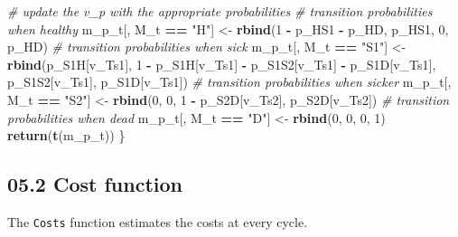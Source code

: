 \documentclass[
]{article}
\newenvironment{Shaded}{\begin{snugshade}}{\end{snugshade}}
\newcommand{\CommentTok}[1]{\textcolor[rgb]{0.56,0.35,0.01}{\textit{#1}}}
\newcommand{\DecValTok}[1]{\textcolor[rgb]{0.00,0.00,0.81}{#1}}
\newcommand{\KeywordTok}[1]{\textcolor[rgb]{0.13,0.29,0.53}{\textbf{#1}}}
\newcommand{\NormalTok}[1]{#1}
\newcommand{\OperatorTok}[1]{\textcolor[rgb]{0.81,0.36,0.00}{\textbf{#1}}}
\newcommand{\StringTok}[1]{\textcolor[rgb]{0.31,0.60,0.02}{#1}}
\begin{document}
\begin{Shaded}
\begin{Highlighting}[]
  \CommentTok{# update the v_p with the appropriate probabilities   }
  \CommentTok{# transition probabilities when healthy}
\NormalTok{  m_p_t[, M_t }\OperatorTok{==}\StringTok{ "H"}\NormalTok{]  <-}\StringTok{ }\KeywordTok{rbind}\NormalTok{(}\DecValTok{1} \OperatorTok{-}\StringTok{ }\NormalTok{p_HS1 }\OperatorTok{-}\StringTok{ }\NormalTok{p_HD, p_HS1, }\DecValTok{0}\NormalTok{, p_HD)   }
  \CommentTok{# transition probabilities when sick}
\NormalTok{  m_p_t[, M_t }\OperatorTok{==}\StringTok{ "S1"}\NormalTok{] <-}\StringTok{ }\KeywordTok{rbind}\NormalTok{(p_S1H[v_Ts1], }\DecValTok{1} \OperatorTok{-}\StringTok{ }\NormalTok{p_S1H[v_Ts1] }\OperatorTok{-}\StringTok{ }\NormalTok{p_S1S2[v_Ts1] }\OperatorTok{-}\StringTok{ }
\StringTok{                                }\NormalTok{p_S1D[v_Ts1], p_S1S2[v_Ts1], p_S1D[v_Ts1])  }
  \CommentTok{# transition probabilities when sicker}
\NormalTok{  m_p_t[, M_t }\OperatorTok{==}\StringTok{ "S2"}\NormalTok{] <-}\StringTok{ }\KeywordTok{rbind}\NormalTok{(}\DecValTok{0}\NormalTok{, }\DecValTok{0}\NormalTok{, }\DecValTok{1} \OperatorTok{-}\StringTok{ }\NormalTok{p_S2D[v_Ts2], p_S2D[v_Ts2])                   }
  \CommentTok{# transition probabilities when dead  }
\NormalTok{  m_p_t[, M_t }\OperatorTok{==}\StringTok{ "D"}\NormalTok{]  <-}\StringTok{ }\KeywordTok{rbind}\NormalTok{(}\DecValTok{0}\NormalTok{, }\DecValTok{0}\NormalTok{, }\DecValTok{0}\NormalTok{, }\DecValTok{1}\NormalTok{)                                                         }
  \KeywordTok{return}\NormalTok{(}\KeywordTok{t}\NormalTok{(m_p_t))}
\NormalTok{\}       }
\end{Highlighting}
\end{Shaded}

\hypertarget{cost-function}{%
\subsection{05.2 Cost function}\label{cost-function}}

The \texttt{Costs} function estimates the costs at every cycle.
\end{document}
